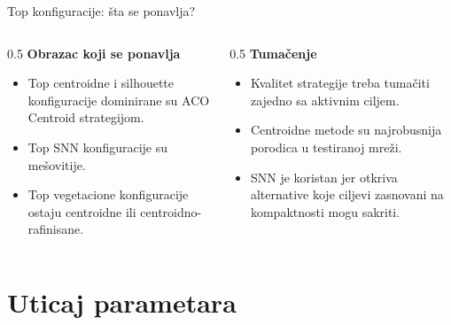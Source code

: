 \documentclass[aspectratio=169,10pt]{beamer}
\begin{document}
\begin{frame}{Top konfiguracije: šta se ponavlja?}
  \begin{columns}[T]
    \begin{column}{0.5\textwidth}
      \textbf{Obrazac koji se ponavlja}
      \begin{itemize}
        \item Top centroidne i silhouette konfiguracije dominirane su ACO Centroid strategijom.
        \item Top SNN konfiguracije su mešovitije.
        \item Top vegetacione konfiguracije ostaju centroidne ili centroidno-rafinisane.
      \end{itemize}
    \end{column}
    \begin{column}{0.5\textwidth}
      \textbf{Tumačenje}
      \begin{itemize}
        \item Kvalitet strategije treba tumačiti zajedno sa aktivnim ciljem.
        \item Centroidne metode su najrobusnija porodica u testiranoj mreži.
        \item SNN je koristan jer otkriva alternative koje ciljevi zasnovani na kompaktnosti mogu sakriti.
      \end{itemize}
    \end{column}
  \end{columns}
\end{frame}

\section{Uticaj parametara}
\end{document}

